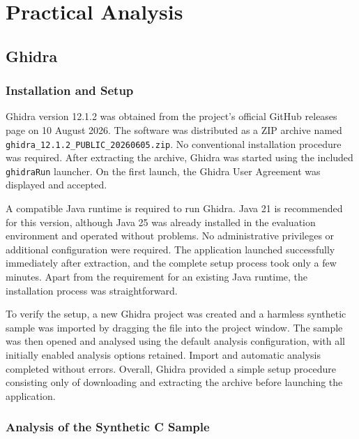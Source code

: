 \cleardoubleoddpage%
\chapter{Practical Analysis}
\label{sec:analysis}


\section{Ghidra}
\label{sec:analysis:ghidra}

\subsection{Installation and Setup}
\label{subsec:analysis:ghidra:setup}
Ghidra version 12.1.2 was obtained from the project's official GitHub releases page on 10 August 2026. The software was distributed as a ZIP archive 
named \texttt{ghidra\_12.1.2\_PUBLIC\_20260605.zip}. No conventional installation procedure was required. After extracting the archive, Ghidra was started 
using the included \texttt{ghidraRun} launcher. On the first launch, the Ghidra User Agreement was displayed and accepted.

A compatible Java runtime is required to run Ghidra. Java 21 is recommended for this version, although Java 25 was already installed in the evaluation 
environment and operated without problems. No administrative privileges or additional configuration were required. The application launched successfully 
immediately after extraction, and the complete setup process took only a few minutes. Apart from the requirement for an existing Java runtime, the installation 
process was straightforward.

To verify the setup, a new Ghidra project was created and a harmless synthetic sample was imported by dragging the file into the project window. 
The sample was then opened and analysed using the default analysis configuration, with all initially enabled analysis options retained. Import and automatic 
analysis completed without errors. Overall, Ghidra provided a simple setup procedure consisting only of downloading and extracting the archive before launching 
the application.

\subsection{Analysis of the Synthetic C Sample}
\label{subsec:analysis:ghidra:synthetic}

